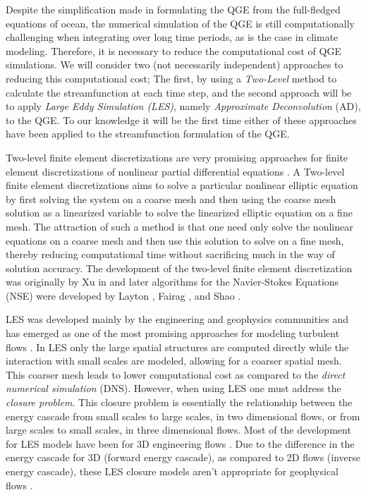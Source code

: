 Despite the simplification made in formulating the QGE from the full-fledged
equations of ocean, the numerical simulation of the QGE is still computationally
challenging when integrating over long time periods, as is the case in climate
modeling. Therefore, it is necessary to reduce the computational cost of QGE
simulations. We will consider two (not necessarily independent) approaches to
reducing this computational cost; The first, by using a \emph{Two-Level} method
to calculate the streamfunction at each time step, and the second approach will
be to apply \emph{Large Eddy Simulation (LES)}, namely \emph{Approximate
Deconvolution} (AD), to the QGE. To our knowledge it will be the first time
either of these approaches have been applied to the streamfunction formulation
of the QGE.

Two-level finite element discretizations are very promising approaches for
finite element discretizations of nonlinear partial differential equations
\cite{Fairag98,Layton93}. A Two-level finite element discretizations aims to
solve a particular nonlinear elliptic equation by first solving the system on a
coarse mesh and then using the coarse mesh solution as a linearized variable to
solve the linearized elliptic equation on  a fine mesh. The attraction of such a
method is that one need only solve the nonlinear equations on a coarse mesh and
then use this solution to solve on a fine mesh, thereby reducing computational
time without sacrificing much in the way of solution accuracy. The development
of the two-level finite element discretization was originally by Xu in
\cite{Xu94} and later algorithms for the Navier-Stokes Equations (NSE) were
developed by Layton \cite{Layton93}, Fairag \cite{Fairag98, Fairag03}, and Shao
\cite{Shao11}.

LES was developed mainly by the engineering and geophysics communities and has
emerged as one of the most promising approaches for modeling turbulent flows
\cite{Iliescu00}. In LES only the large spatial structures are computed directly
while the interaction with small scales are modeled, allowing for a coarser
spatial mesh. This coarser mesh leads to lower computational cost as compared to
the \emph{direct numerical simulation} (DNS). However, when using LES one must
address the \emph{closure problem}.  This closure problem is essentially the
relationship between the energy cascade from small scales to large scales, in
two dimensional flows, or from large scales to small scales, in three
dimensional flows. Most of the development for LES models have been for 3D
engineering flows \cite{Berselli06}.  Due to the difference in the energy
cascade for 3D (forward energy cascade), as compared to 2D flows (inverse energy
cascade), these LES closure models aren't appropriate for geophysical flows
\cite{San11}.

